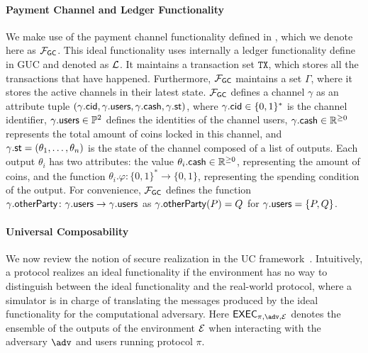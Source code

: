 \paragraph{Payment Channel and Ledger Functionality}
We make use of the payment channel functionality defined in , which we denote here as $\mathcal{F}_{\mathsf{GC}}$. This ideal 
functionality uses internally a ledger functionality define in GUC and denoted as $\mathcal{L}$.
It maintains a transaction set $\mathtt{TX}$, which stores all the transactions that have 
happened. Furthermore, $\mathcal{F}_{\mathsf{GC}}$ maintains a set $\Gamma$, where it stores the active 
channels in their latest state. $\mathcal{F}_{\mathsf{GC}}$ defines a channel $\gamma$ as an attribute tuple 
$(\gamma.\mathsf{cid}, \gamma.\mathsf{users}, \gamma.\mathsf{cash}, \gamma.\mathsf{st})$, where $\gamma.\mathsf{cid} \in \{0,1\}^*$ is 
the channel identifier, $\gamma.\mathsf{users} \in \mathbb{P}^2$ defines the identities of the channel 
users, $\gamma.\mathsf{cash} \in \mathbb{R}^{\geq 0}$ represents the total amount of coins locked in 
this channel, and $\gamma.\mathsf{st} = (\theta_1,\ldots,\theta_n)$ is the state of the channel 
composed of a list of outputs. Each output $\theta_i$ has two attributes: the value $\theta_i.
\mathsf{cash} \in \mathbb{R}^{\geq 0}$, representing the amount of coins, and the function $\theta_i.
\varphi \colon \{0,1\}^* \to \{0,1\}$, representing the spending condition of the output. 
For convenience, $\mathcal{F}_{\mathsf{GC}}$ defines the function $\gamma.\mathsf{otherParty} \colon \gamma.\mathsf{users} \to 
\gamma.\mathsf{users}$ as $\gamma.\mathsf{otherParty}(P) = Q$ for $\gamma.\mathsf{users} = \{P,Q\}$.



\paragraph{Universal Composability}
We now review the notion of secure realization in the UC framework~\cite{canetti}. 
Intuitively, a protocol realizes an ideal functionality if the environment has no way 
to distinguish between the ideal functionality and the real-world protocol, where 
a simulator is in charge of translating the messages produced by the ideal functionality 
for the computational adversary. Here $\exec_{\pi, \adv, \dist}$ denotes the ensemble of 
the outputs of the environment $\mathcal{E}$ when interacting with the adversary $\adv$ and 
users running protocol $\pi$.

